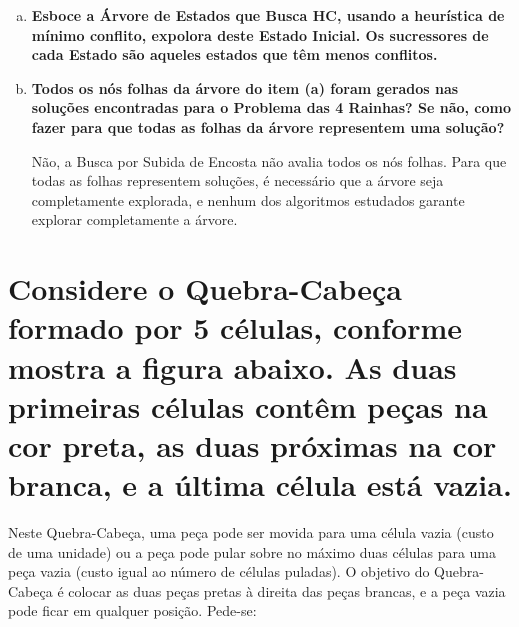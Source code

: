 \documentclass[paper=a4, fontsize=11pt]{scrartcl} %
\begin{document}
    \begin{enumerate}[(a)]
        \item \textbf{Esboce a Árvore de Estados que Busca HC, usando a heurística de mínimo conflito, expolora deste Estado Inicial. Os sucressores de cada Estado são aqueles estados que têm menos conflitos.}
        \par 
        \vspace{0.2cm}

        \item \textbf{Todos os nós folhas da árvore do item (a) foram gerados nas soluções encontradas para o Problema das 4 Rainhas? Se não, como fazer para que todas as folhas da árvore representem uma solução?}
        \par Não, a Busca por Subida de Encosta não avalia todos os nós folhas. Para que todas as folhas representem soluções, é necessário que a árvore seja completamente explorada, e nenhum dos algoritmos estudados garante explorar completamente a árvore.
        \vspace{0.2cm}

    \end{enumerate}

    
    \section{Considere o Quebra-Cabeça formado por 5 células, conforme mostra a figura abaixo. As duas primeiras células contêm peças na cor preta, as duas próximas na cor branca, e a última célula está vazia.}
    
   
    \par{Neste Quebra-Cabeça, uma peça pode ser movida para uma célula vazia (custo de uma unidade) ou a peça pode pular sobre no máximo duas células para uma peça vazia (custo igual ao número de células puladas). O objetivo do Quebra-Cabeça é colocar as duas peças pretas à direita das peças brancas, e a peça vazia pode ficar em qualquer posição. Pede-se:}
\end{document}
